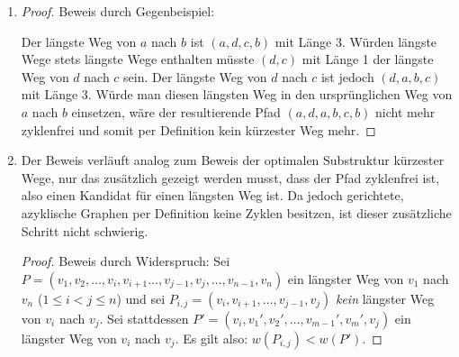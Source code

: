 \documentclass[11pt,a4paper]{article}
\begin{document}
\begin{loesung}
    \begin{enumerate}
        \item 
        \begin{proof}
            Beweis durch Gegenbeispiel:
            \begin{figure}[h!]
                \centering
            \end{figure}
            \FloatBarrier
            Der längste Weg von $a$ nach $b$ ist $(a, d, c, b)$ mit Länge 3.
            Würden längste Wege stets längste Wege enthalten müsste $(d, c)$ mit Länge 1 der längste Weg von $d$ nach $c$ sein.
            Der längste Weg von $d$ nach $c$ ist jedoch $(d, a, b, c)$ mit Länge 3.
            Würde man diesen längsten Weg in den ursprünglichen Weg von $a$ nach $b$ einsetzen, wäre der resultierende Pfad $(a, d, a, b, c, b)$ nicht mehr zyklenfrei und somit per Definition kein kürzester Weg mehr.
        \end{proof}
        \item
        Der Beweis verläuft analog zum Beweis der optimalen Substruktur kürzester Wege, nur das zusätzlich gezeigt werden musst, dass der  Pfad zyklenfrei ist, also einen Kandidat für einen längsten Weg ist.
        Da jedoch gerichtete, azyklische Graphen per Definition keine Zyklen besitzen, ist dieser zusätzliche Schritt nicht schwierig.
        \begin{proof}
            Beweis durch Widerspruch:
            Sei $P = (v_1, v_2, \ldots, v_i, v_{i + 1} \ldots, v_{j - 1}, v_j, \ldots, v_{n - 1}, v_n)$ ein längster Weg von $v_1$ nach $v_n$ ($1 \leq i < j \leq n$) und sei $P_{i, j} = (v_i, v_{i + 1}, \ldots, v_{j - 1}, v_j)$ \emph{kein} längster Weg von $v_i$ nach $v_j$.
            Sei stattdessen $P' = (v_i, v_1', v_2', \ldots, v_{m - 1}', v_m', v_j)$ ein längster Weg von $v_i$ nach $v_j$.
            Es gilt also: $w(P_{i, j}) < w(P')$.


\end{proof}
\end{enumerate}
\end{loesung}
\end{document}
